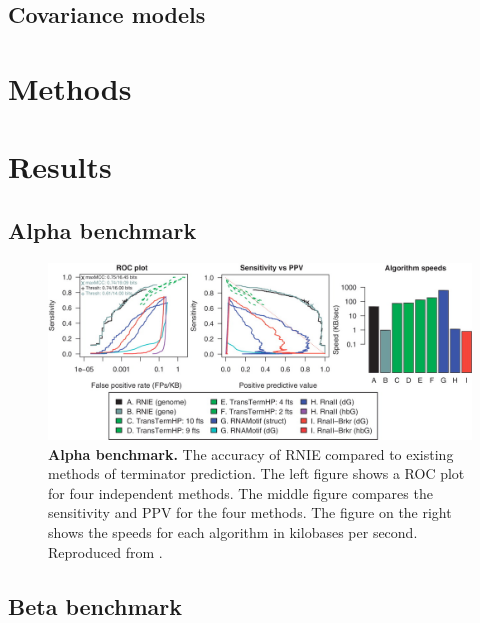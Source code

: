 \subsection{Covariance models}

\section{Methods}

\section{Results}
\subsection{Alpha benchmark}

\begin{figure}[htp]
\begin{center}
\includegraphics[width=14cm]{alpha.jpg}
\caption[Alpha benchmark]{\textbf{Alpha benchmark.} The accuracy of RNIE compared to existing methods of terminator prediction. The left figure shows a ROC plot for four independent methods. The middle figure compares the sensitivity and PPV for the four methods. The figure on the right shows the speeds for each algorithm in kilobases per second. Reproduced from \textcite{Gardner2011a}.
} 
\label{fig:alpha}
\end{center}
\end{figure}

\subsection{Beta benchmark}



